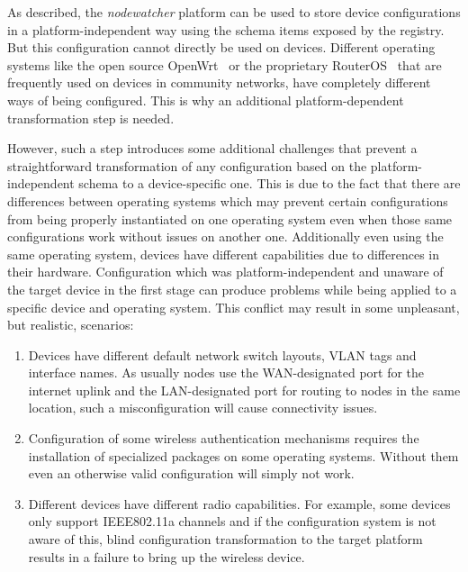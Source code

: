 \documentclass[5p,sort&compress]{elsarticle}
\newcommand{\nodewatcher}{\textit{nodewatcher}}
\begin{document}
As described, the \nodewatcher{} platform can be used to store device configurations in a platform-independent way using the schema items exposed by the registry.
But this configuration cannot directly be used on devices.
Different operating systems like the open source OpenWrt~\cite{OpenWrt_2004} or the proprietary RouterOS~\cite{RouterOS_1995} that are frequently used on devices in community networks, have completely different ways of being configured.
This is why an additional platform-dependent transformation step is needed.

However, such a step introduces some additional challenges that prevent a straightforward transformation of any configuration based on the platform-independent schema to a device-specific one.
This is due to the fact that there are differences between operating systems which may prevent certain configurations from being properly instantiated on one operating system even when those same configurations work without issues on another one.
Additionally even using the same operating system, devices have different capabilities due to differences in their hardware.
Configuration which was platform-independent and unaware of the target device in the first stage can produce problems while being applied to a specific device and operating system.
This conflict may result in some unpleasant, but realistic, scenarios:
\begin{enumerate}[label=\roman*)]
\item Devices have different default network switch layouts, VLAN tags and interface names.
As usually nodes use the WAN-designated port for the internet uplink and the LAN-designated port for routing to nodes in the same location, such a misconfiguration will cause connectivity issues.

\item Configuration of some wireless authentication mechanisms requires the installation of specialized packages on some operating systems.
Without them even an otherwise valid configuration will simply not work.

\item Different devices have different radio capabilities.
For example, some devices only support IEEE802.11a channels and if the configuration system is not aware of this, blind configuration transformation to the target platform results in a failure to bring up the wireless device.
\end{enumerate}
\end{document}
